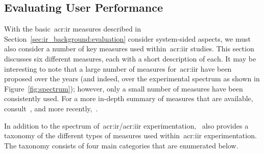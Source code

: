 \subsection{Evaluating User Performance}\label{sec:ir_background:user:evaluation}
With the basic~\gls{acr:ir} measures described in Section~\ref{sec:ir_background:evaluation} consider system-sided aspects, we must also consider a number of key measures used within~\gls{acr:iir} studies. This section discusses six different measures, each with a short description of each. It may be interesting to note that a large number of measures for~\gls{acr:iir} have been proposed over the years (and indeed, over the experimental spectrum as shown in Figure~\ref{fig:spectrum}); however, only a small number of measures have been consistently used. For a more in-depth summary of measures that are available, consult~\cite{su1992iir_measures}, and more recently,~\cite{kelly2009iir}.

In addition to the spectrum of~\gls{acr:ir}/\gls{acr:iir} experimentation,~\cite{kelly2009iir} also provides a taxonomy of the different types of measures used within~\gls{acr:iir} experimentation. The taxonomy consists of four main categories that are enumerated below.

